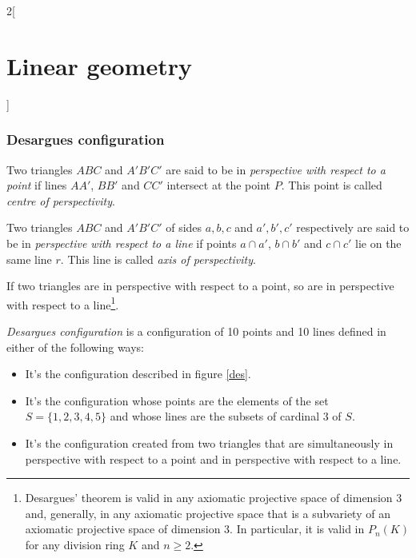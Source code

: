 \documentclass[../../../main.tex]{subfiles}
\begin{document}
\begin{multicols}{2}[\section{Linear geometry}]
  \subsubsection{Desargues configuration}
  \begin{definition}
    Two triangles $ABC$ and $A'B'C'$ are said to be in \textit{perspective with respect to a point} if lines $AA'$, $BB'$ and $CC'$ intersect at the point $P$. This point is called \textit{centre of perspectivity}.
  \end{definition}
  \begin{definition}
    Two triangles $ABC$ and $A'B'C'$ of sides $a,b,c$ and $a',b',c'$ respectively are said to be in \textit{perspective with respect to a line} if points $a\cap a'$, $b\cap b'$ and $c\cap c'$ lie on the same line $r$. This line is called \textit{axis of perspectivity}.
  \end{definition}
  \begin{theorem}
    If two triangles are in perspective with respect to a point, so are in perspective with respect to a line\footnote{Desargues' theorem is valid in any axiomatic projective space of dimension 3 and, generally, in any axiomatic projective space that is a subvariety of an axiomatic projective space of dimension 3. In particular, it is valid in $P_n(K)$ for any division ring $K$ and $n\geq2$.}.
  \end{theorem}
  \begin{definition}
    \textit{Desargues configuration} is a configuration of 10 points and 10 lines defined in either of the following ways:
    \begin{itemize}
      \item It's the configuration described in figure \ref{des}.
            \begin{center}
              \begin{minipage}{\linewidth}
                \centering
                
                \label{des}
              \end{minipage}
            \end{center}
      \item It's the configuration whose points are the elements of the set $S=\{1,2,3,4,5\}$ and whose lines are the subsets of cardinal 3 of $S$.
      \item It's the configuration created from two triangles that are simultaneously in perspective with respect to a point and in perspective with respect to a line.

\end{itemize}
\end{definition}
\end{multicols}
\end{document}
